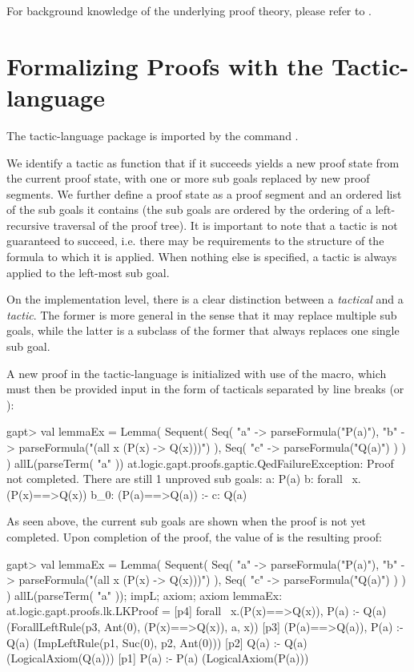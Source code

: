 \documentclass{article}
\newcommand{\cli}[1]{{\ttfamily {#1}}}
\begin{document}
For background knowledge of the underlying proof theory, please refer to \cite{buss1998introduction}.

\section{Formalizing Proofs with the Tactic-language}\label{formalizingProofs}

The tactic-language package is imported by the command \cli{import at.logic.gapt.proofs.gaptic.\_}.

We identify a tactic as function that if it succeeds yields a new proof state from the current proof state, with one or more sub goals replaced by new proof segments. We further define a proof state as a proof segment and an ordered list of the sub goals it contains (the sub goals are ordered by the ordering of a left-recursive traversal of the proof tree). It is important to note that a tactic is not guaranteed to succeed, i.e. there may be requirements to the structure of the formula to which it is applied. When nothing else is specified, a tactic is always applied to the left-most sub goal.
 
On the implementation level, there is a clear distinction between a \emph{tactical} and a \emph{tactic}. The former is more general in the sense that it may replace multiple sub goals, while the latter is a subclass of the former that always replaces one single sub goal.

A new proof in the tactic-language is initialized with use of the \cli{Lemma} macro, which must then be provided input in the form of tacticals separated by line breaks (or \cli{;}):

\begin{clilisting}
gapt> val lemmaEx = Lemma( Sequent( Seq( "a" -> parseFormula("P(a)"), "b" -> parseFormula("(all x (P(x) -> Q(x)))") ), Seq( "c" -> parseFormula("Q(a)") ) ) ) { allL(parseTerm( "a" )) }
at.logic.gapt.proofs.gaptic.QedFailureException: Proof not completed. There are still 1 unproved sub goals:
a: P(a)
b: forall~ x.(P(x)==>Q(x))
b_0: (P(a)==>Q(a))
:-
c: Q(a)
\end{clilisting}

As seen above, the current sub goals are shown when the proof is not yet completed. Upon completion of the proof, the value of \cli{lemmaEx} is the resulting proof:

\begin{clilisting}
gapt> val lemmaEx = Lemma( Sequent( Seq( "a" -> parseFormula("P(a)"), "b" -> parseFormula("(all x (P(x) -> Q(x)))") ), Seq( "c" -> parseFormula("Q(a)") ) ) ) { allL(parseTerm( "a" )); impL; axiom; axiom }
lemmaEx: at.logic.gapt.proofs.lk.LKProof =
[p4] forall~ x.(P(x)==>Q(x)), P(a) :- Q(a)    (ForallLeftRule(p3, Ant(0), (P(x)==>Q(x)), a, x))
[p3] (P(a)==>Q(a)), P(a) :- Q(a)    (ImpLeftRule(p1, Suc(0), p2, Ant(0)))
[p2] Q(a) :- Q(a)    (LogicalAxiom(Q(a)))
[p1] P(a) :- P(a)    (LogicalAxiom(P(a)))
\end{clilisting}
\end{document}
